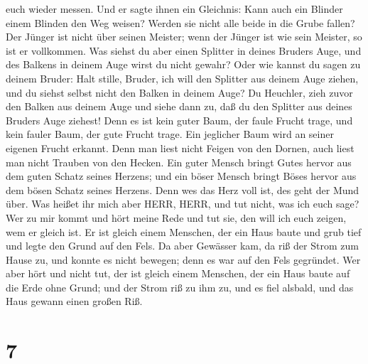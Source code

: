 euch wieder messen.  Und er sagte ihnen ein Gleichnis: Kann
auch ein Blinder einem Blinden den Weg weisen? Werden sie nicht alle
beide in die Grube fallen?  Der Jünger ist nicht über
seinen Meister; wenn der Jünger ist wie sein Meister, so ist er
vollkommen.  Was siehst du aber einen Splitter in deines
Bruders Auge, und des Balkens in deinem Auge wirst du nicht gewahr?
 Oder wie kannst du sagen zu deinem Bruder: Halt stille,
Bruder, ich will den Splitter aus deinem Auge ziehen, und du siehst
selbst nicht den Balken in deinem Auge? Du Heuchler, zieh zuvor den
Balken aus deinem Auge und siehe dann zu, daß du den Splitter aus deines
Bruders Auge ziehest!  Denn es ist kein guter Baum, der
faule Frucht trage, und kein fauler Baum, der gute Frucht trage.
 Ein jeglicher Baum wird an seiner eigenen Frucht erkannt.
Denn man liest nicht Feigen von den Dornen, auch liest man nicht Trauben
von den Hecken.  Ein guter Mensch bringt Gutes hervor aus
dem guten Schatz seines Herzens; und ein böser Mensch bringt Böses
hervor aus dem bösen Schatz seines Herzens. Denn wes das Herz voll ist,
des geht der Mund über.  Was heißet ihr mich aber HERR,
HERR, und tut nicht, was ich euch sage?  Wer zu mir kommt
und hört meine Rede und tut sie, den will ich euch zeigen, wem er gleich
ist.  Er ist gleich einem Menschen, der ein Haus baute und
grub tief und legte den Grund auf den Fels. Da aber Gewässer kam, da riß
der Strom zum Hause zu, und konnte es nicht bewegen; denn es war auf den
Fels gegründet.  Wer aber hört und nicht tut, der ist
gleich einem Menschen, der ein Haus baute auf die Erde ohne Grund; und
der Strom riß zu ihm zu, und es fiel alsbald, und das Haus gewann einen
großen Riß.

\hypertarget{section-6}{%
\section{7}\label{section-6}}

